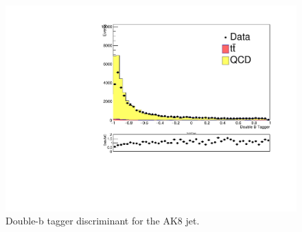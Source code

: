 \begin{figure}[h]
\begin{center}
\includegraphics[scale=0.5]{Figures/ratMCdoubleb.pdf}
\end{center}
\caption{Double-b tagger discriminant for the AK8 jet.}
\label{fig:dMCdoubleb}
\end{figure} 

